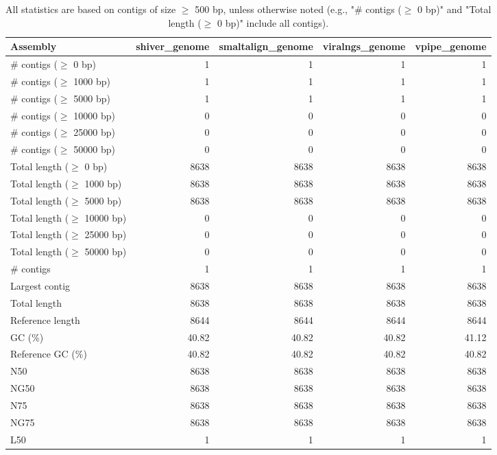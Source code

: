 \documentclass[12pt,a4paper]{article}
\begin{document}
\begin{table}[ht]
\begin{center}
\caption{All statistics are based on contigs of size $\geq$ 500 bp, unless otherwise noted (e.g., "\# contigs ($\geq$ 0 bp)" and "Total length ($\geq$ 0 bp)" include all contigs).}
\begin{tabular}{|l*{4}{|r}|}
\hline
Assembly & shiver\_genome & smaltalign\_genome & viralngs\_genome & vpipe\_genome \\ \hline
\# contigs ($\geq$ 0 bp) & 1 & 1 & 1 & 1 \\ \hline
\# contigs ($\geq$ 1000 bp) & 1 & 1 & 1 & 1 \\ \hline
\# contigs ($\geq$ 5000 bp) & 1 & 1 & 1 & 1 \\ \hline
\# contigs ($\geq$ 10000 bp) & 0 & 0 & 0 & 0 \\ \hline
\# contigs ($\geq$ 25000 bp) & 0 & 0 & 0 & 0 \\ \hline
\# contigs ($\geq$ 50000 bp) & 0 & 0 & 0 & 0 \\ \hline
Total length ($\geq$ 0 bp) & 8638 & 8638 & 8638 & 8638 \\ \hline
Total length ($\geq$ 1000 bp) & 8638 & 8638 & 8638 & 8638 \\ \hline
Total length ($\geq$ 5000 bp) & 8638 & 8638 & 8638 & 8638 \\ \hline
Total length ($\geq$ 10000 bp) & 0 & 0 & 0 & 0 \\ \hline
Total length ($\geq$ 25000 bp) & 0 & 0 & 0 & 0 \\ \hline
Total length ($\geq$ 50000 bp) & 0 & 0 & 0 & 0 \\ \hline
\# contigs & 1 & 1 & 1 & 1 \\ \hline
Largest contig & 8638 & 8638 & 8638 & 8638 \\ \hline
Total length & 8638 & 8638 & 8638 & 8638 \\ \hline
Reference length & 8644 & 8644 & 8644 & 8644 \\ \hline
GC (\%) & 40.82 & 40.82 & 40.82 & 41.12 \\ \hline
Reference GC (\%) & 40.82 & 40.82 & 40.82 & 40.82 \\ \hline
N50 & 8638 & 8638 & 8638 & 8638 \\ \hline
NG50 & 8638 & 8638 & 8638 & 8638 \\ \hline
N75 & 8638 & 8638 & 8638 & 8638 \\ \hline
NG75 & 8638 & 8638 & 8638 & 8638 \\ \hline
L50 & 1 & 1 & 1 & 1 \\ \hline

\end{tabular}
\end{center}
\end{table}
\end{document}
